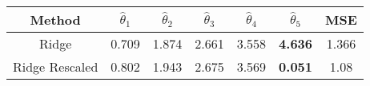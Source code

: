 \begin{tabular}{|c|cccccc|}
  \hline
\textbf{Method} & \( \hat{\theta}_1 \) & \( \hat{\theta}_2 \) & \( \hat{\theta}_3 \) & \( \hat{\theta}_4 \) & \( \hat{\theta}_5 \) & MSE \\ \hline
 Ridge & 0.709 & 1.874 & 2.661 & 3.558 & \textbf{4.636} & 1.366 \\ 
  Ridge Rescaled & 0.802 & 1.943 & 2.675 & 3.569 & \textbf{0.051} & 1.08 \\ 
   \hline
\end{tabular}
